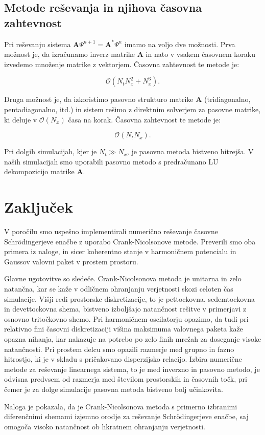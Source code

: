 \documentclass[12pt,a4paper]{article}
\begin{document}
\subsection{Metode reševanja in njihova časovna zahtevnost}

Pri reševanju sistema $\mathbf{A} \Psi^{n+1} = \mathbf{A}^* \Psi^n$ imamo na voljo dve možnosti. Prva možnost je, da izračunamo inverz matrike $\mathbf{A}$ in nato v vsakem časovnem koraku izvedemo množenje matrike z vektorjem. Časovna zahtevnost te metode je:

\begin{equation}
\mathcal{O}(N_t N_x^2 + N_x^3).
\end{equation}

Druga možnost je, da izkoristimo pasovno strukturo matrike $\mathbf{A}$ (tridiagonalno, pentadiagonalno, itd.) in sistem rešimo z direktnim solverjem za pasovne matrike, ki deluje v $\mathcal{O}(N_x)$ časa na korak. Časovna zahtevnost te metode je:

\begin{equation}
\mathcal{O}(N_t N_x).
\end{equation}

Pri dolgih simulacijah, kjer je $N_t \gg N_x$, je pasovna metoda bistveno hitrejša. V naših simulacijah smo uporabili pasovno metodo s predračunano LU dekompozicijo matrike $\mathbf{A}$.

\section{Zaključek}

V poročilu smo uspešno implementirali numerično reševanje časovne Schrödingerjeve enačbe z uporabo Crank-Nicolsonove metode. Preverili smo oba primera iz naloge, in sicer koherentno stanje v harmoničnem potencialu in Gaussov valovni paket v prostem prostoru.

Glavne ugotovitve so sledeče. Crank-Nicolsonova metoda je unitarna in zelo natančna, kar se kaže v odličnem ohranjanju verjetnosti skozi celoten čas simulacije. Višji redi prostorske diskretizacije, to je pettockovna, sedemtockovna in devettockovna shema, bistveno izboljšajo natančnost rešitve v primerjavi z osnovno tritočkovno shemo. Pri harmoničnem oscilatorju opazimo, da tudi pri relativno fini časovni diskretizaciji višina maksimuma valovnega paketa kaže opazna nihanja, kar nakazuje na potrebo po zelo finih mrežah za doseganje visoke natančnosti. Pri prostem delcu smo opazili razmerje med grupno in fazno hitrostjo, ki je v skladu s pričakovano disperzijsko relacijo. Izbira numerične metode za reševanje linearnega sistema, to je med inverzno in pasovno metodo, je odvisna predvsem od razmerja med številom prostorskih in časovnih točk, pri čemer je za dolge simulacije pasovna metoda bistveno bolj učinkovita.

Naloga je pokazala, da je Crank-Nicolsonova metoda s primerno izbranimi diferenčnimi shemami izjemno orodje za reševanje Schrödingerjeve enačbe, saj omogoča visoko natančnost ob hkratnem ohranjanju verjetnosti.
\end{document}
